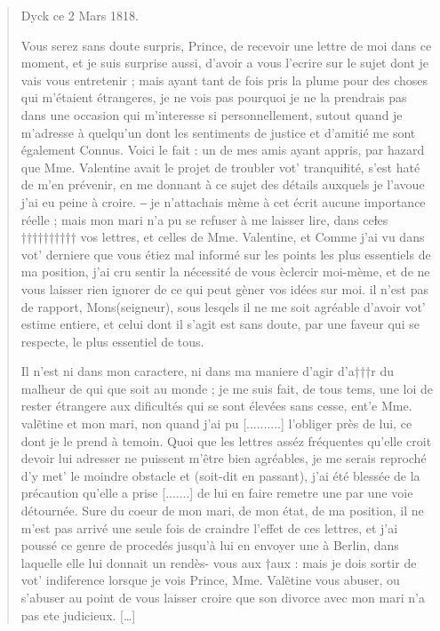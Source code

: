 \documentclass[a4paper,12pt,twoside]{book}
\begin{document}
			\begin{quotation}
				\begin{flushright}
					Dyck ce 2 Mars 1818.
				\end{flushright}
				
				Vous serez sans doute surpris, Prince, de recevoir une lettre
				de moi dans ce moment, et je suis surprise aussi, d'avoir a vous
				l'ecrire sur le sujet dont je vais vous entretenir ; mais ayant tant
				de fois pris la plume pour des choses qui m'étaient étrangeres, je ne
				vois pas pourquoi je ne la prendrais pas dans une occasion qui
				m'interesse si personnellement, sutout quand je m'adresse à quelqu'un
				dont les sentiments de justice et d'amitié me sont également Connus.
				Voici le fait : un de mes amis ayant appris, par hazard que
				Mme. Valentine avait le projet de troubler vot' tranquiƚité, s'est
				haté de m'en prévenir, en me donnant à ce sujet des détails auxquels
				je l'avoue j'ai eu peine à croire. ‒ je n'attachais mème à cet
				écrit aucune importance réelle ; mais mon mari n'a pu se refuser
				à me laisser lire, dans ceƚes †††††††††† vos lettres, et celles de
				Mme. Valentine, et Comme j'ai vu dans vot' derniere que
				vous étiez mal informé sur les points les plus essentiels de ma
				position, j'ai cru sentir la nécessité de vous èclercir moi-mème,
				et de ne vous laisser rien ignorer de ce qui peut gèner vos idées
				sur moi. il n'est pas de rapport, Mons(seigneur), sous lesqels il ne
				me soit agréable d'avoir vot' estime entiere, et celui dont
				il s'agit est sans doute, par une faveur qui se respecte, le plus
				essentiel de tous.
				
				Il n'est ni dans mon caractere, ni dans ma maniere d'agir d'a†††r
				du malheur de qui que soit au monde ; je me suis fait, de tous
				tems, une loi de rester étrangere aux dificultés qui se sont élevées
				sans cesse, ent'e Mme. valẽtine et mon mari, non quand j'ai
				pu [..........] l'obliger près de lui, ce dont je le prend à temoin.
				Quoi que les lettres asséz fréquentes qu'elle croit devoir lui adresser ne
				puissent m'être bien agréables, je me serais reproché d'y met' le
				moindre obstacle et (soit-dit en passant), j'ai été blessée de la précaution
				qu'elle a prise [.......] de lui en faire remetre une par une
				voie détournée. Sure du coeur de mon mari, de mon état, de
				ma position, il ne m'est pas arrivé une seule fois de craindre
				l'effet de ces lettres, et j'ai poussé ce genre de procedés jusqu'à lui en
				envoyer une à Berlin, dans laquelle elle lui donnait un rendès-
				vous aux †aux : mais je dois sortir de vot' indiference lorsque
				je vois Prince, Mme. Valẽtine vous abuser, ou s'abuser au
				point de vous laisser croire que son divorce avec mon mari
				n'a pas ete judicieux. […]
				
			\end{quotation}
	\pagestyle{empty}				
	\cleardoublepage
	\pagestyle{plain}					
	
\end{document}
